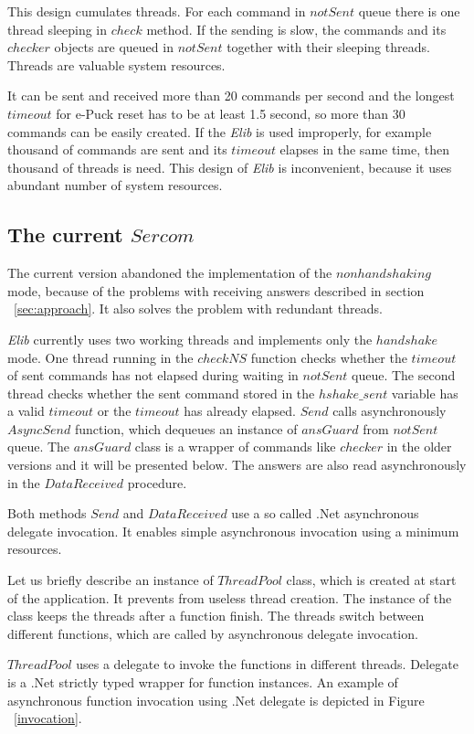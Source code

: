 	This design cumulates threads. For each command in $notSent$ queue there is 
	one thread sleeping in $check$ method. If the sending is slow, the commands and its $checker$ objects are queued in
	$notSent$ together with their sleeping threads. Threads are valuable system resources. 

	It can be sent and received more than 20 commands per second and the longest $timeout$ for 
	e-Puck reset has to be at least 1.5 second, so more than 30 commands can be easily created.
	If the {\it Elib} is used improperly, for example thousand of commands are sent and its $timeout$ elapses
	in the same time, then thousand of threads is need. This design of {\it Elib} is inconvenient, because
	it uses abundant number of system resources.

\subsection*{The current $Sercom$}\label{sec:current}
	The current version abandoned the implementation of the $nonhandshaking$ mode, 
	because of the problems with receiving answers described 
	in section ~\ref{sec:approach}.
	It also solves the problem with	redundant threads. 
	
	{\it Elib} currently uses two working threads and implements only the $handshake$ mode.
	One thread running in the $checkNS$ function checks whether the $timeout$ of sent commands
	has not elapsed during waiting in $notSent$ queue. The second thread checks whether the sent command
	stored in the $hshake\_sent$ variable has a valid $timeout$ or the $timeout$ has already elapsed.
	$Send$ calls asynchronously $AsyncSend$ function, which dequeues an instance of $ansGuard$ from $notSent$ queue.
	The $ansGuard$ class is a wrapper of commands like $checker$ in the older versions and it will be presented below.
	The answers are also read asynchronously in the $DataReceived$ procedure.

	Both methods $Send$ and $DataReceived$ use a so called .Net asynchronous
	delegate invocation. It enables simple asynchronous invocation using a minimum resources.

	Let us briefly describe an instance of $ThreadPool$ class, which is created at 
	start of the application. It prevents from useless thread creation. The instance of the class keeps the threads after 
	a function finish. The threads switch between different functions, which are called 
	by asynchronous delegate invocation.
	
	$ThreadPool$ uses a delegate to invoke the functions in different threads.
	Delegate\cite{delegate} is a .Net strictly typed wrapper for function instances.
	An example of asynchronous function invocation using .Net delegate is depicted in Figure ~\ref{invocation}.
	
